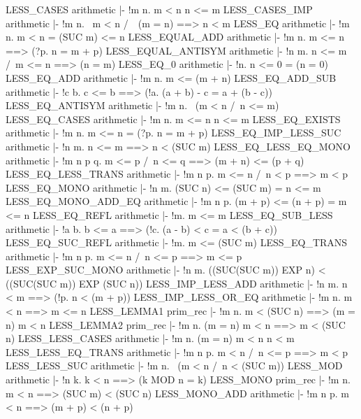 \ENDTHEOREM
\THEOREM LESS\_CASES arithmetic
|- !m n. m < n \/ n <= m
\ENDTHEOREM
\THEOREM LESS\_CASES\_IMP arithmetic
|- !m n. ~m < n /\ ~(m = n) ==> n < m
\ENDTHEOREM
\THEOREM LESS\_EQ arithmetic
|- !m n. m < n = (SUC m) <= n
\ENDTHEOREM
\THEOREM LESS\_EQUAL\_ADD arithmetic
|- !m n. m <= n ==> (?p. n = m + p)
\ENDTHEOREM
\THEOREM LESS\_EQUAL\_ANTISYM arithmetic
|- !n m. n <= m /\ m <= n ==> (n = m)
\ENDTHEOREM
\THEOREM LESS\_EQ\_0 arithmetic
|- !n. n <= 0 = (n = 0)
\ENDTHEOREM
\THEOREM LESS\_EQ\_ADD arithmetic
|- !m n. m <= (m + n)
\ENDTHEOREM
\THEOREM LESS\_EQ\_ADD\_SUB arithmetic
|- !c b. c <= b ==> (!a. (a + b) - c = a + (b - c))
\ENDTHEOREM
\THEOREM LESS\_EQ\_ANTISYM arithmetic
|- !m n. ~(m < n /\ n <= m)
\ENDTHEOREM
\THEOREM LESS\_EQ\_CASES arithmetic
|- !m n. m <= n \/ n <= m
\ENDTHEOREM
\THEOREM LESS\_EQ\_EXISTS arithmetic
|- !m n. m <= n = (?p. n = m + p)
\ENDTHEOREM
\THEOREM LESS\_EQ\_IMP\_LESS\_SUC arithmetic
|- !n m. n <= m ==> n < (SUC m)
\ENDTHEOREM
\THEOREM LESS\_EQ\_LESS\_EQ\_MONO arithmetic
|- !m n p q. m <= p /\ n <= q ==> (m + n) <= (p + q)
\ENDTHEOREM
\THEOREM LESS\_EQ\_LESS\_TRANS arithmetic
|- !m n p. m <= n /\ n < p ==> m < p
\ENDTHEOREM
\THEOREM LESS\_EQ\_MONO arithmetic
|- !n m. (SUC n) <= (SUC m) = n <= m
\ENDTHEOREM
\THEOREM LESS\_EQ\_MONO\_ADD\_EQ arithmetic
|- !m n p. (m + p) <= (n + p) = m <= n
\ENDTHEOREM
\THEOREM LESS\_EQ\_REFL arithmetic
|- !m. m <= m
\ENDTHEOREM
\THEOREM LESS\_EQ\_SUB\_LESS arithmetic
|- !a b. b <= a ==> (!c. (a - b) < c = a < (b + c))
\ENDTHEOREM
\THEOREM LESS\_EQ\_SUC\_REFL arithmetic
|- !m. m <= (SUC m)
\ENDTHEOREM
\THEOREM LESS\_EQ\_TRANS arithmetic
|- !m n p. m <= n /\ n <= p ==> m <= p
\ENDTHEOREM
\THEOREM LESS\_EXP\_SUC\_MONO arithmetic
|- !n m. ((SUC(SUC m)) EXP n) < ((SUC(SUC m)) EXP (SUC n))
\ENDTHEOREM
\THEOREM LESS\_IMP\_LESS\_ADD arithmetic
|- !n m. n < m ==> (!p. n < (m + p))
\ENDTHEOREM
\THEOREM LESS\_IMP\_LESS\_OR\_EQ arithmetic
|- !m n. m < n ==> m <= n
\ENDTHEOREM
\THEOREM LESS\_LEMMA1 prim\_rec
|- !m n. m < (SUC n) ==> (m = n) \/ m < n
\ENDTHEOREM
\THEOREM LESS\_LEMMA2 prim\_rec
|- !m n. (m = n) \/ m < n ==> m < (SUC n)
\ENDTHEOREM
\THEOREM LESS\_LESS\_CASES arithmetic
|- !m n. (m = n) \/ m < n \/ n < m
\ENDTHEOREM
\THEOREM LESS\_LESS\_EQ\_TRANS arithmetic
|- !m n p. m < n /\ n <= p ==> m < p
\ENDTHEOREM
\THEOREM LESS\_LESS\_SUC arithmetic
|- !m n. ~(m < n /\ n < (SUC m))
\ENDTHEOREM
\THEOREM LESS\_MOD arithmetic
|- !n k. k < n ==> (k MOD n = k)
\ENDTHEOREM
\THEOREM LESS\_MONO prim\_rec
|- !m n. m < n ==> (SUC m) < (SUC n)
\ENDTHEOREM
\THEOREM LESS\_MONO\_ADD arithmetic
|- !m n p. m < n ==> (m + p) < (n + p)
